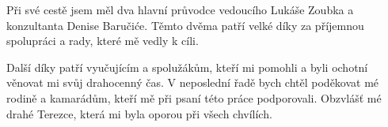 \begin{thanks}
    Při své cestě jsem měl dva hlavní průvodce vedoucího Lukáše Zoubka a konzultanta Denise Baručiće. Těmto dvěma patří velké díky za příjemnou spolupráci a rady, které mě vedly k cíli.\par
	\noindent Další díky patří vyučujícím a spolužákům, kteří mi pomohli a byli ochotní věnovat mi svůj drahocenný čas. V neposlední řadě bych chtěl poděkovat mé rodině a kamarádům, kteří mě při psaní této práce podporovali. Obzvlášť mé drahé Terezce, která mi byla oporou při všech chvílích.
\end{thanks}
